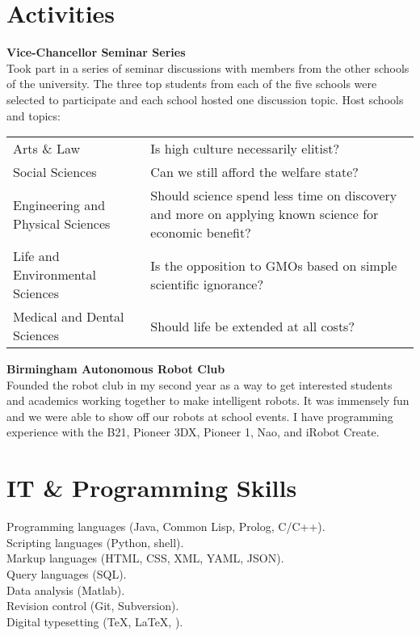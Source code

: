 \documentclass[10pt, a4paper]{article}
\newcommand{\years}[1]{\marginnote{\scriptsize #1}}
\begin{document}
{{\section*{Activities}
\years{2011--2012}\textbf{Vice-Chancellor Seminar Series}\\[.2cm]
Took part in a series of seminar discussions with members from the
other schools of the university. The three top students from each of
the five schools were selected to participate and each school hosted
one discussion topic. Host schools and topics:\\[.1cm]
\small{
  \begin{tabular}{l p{8cm}}
    \hspace{.5cm}Arts \& Law                       & Is high culture necessarily elitist?\\
    \hspace{.5cm}Social Sciences                   & Can we still afford the welfare state?\\
    \hspace{.5cm}Engineering and Physical Sciences & Should science spend less time on discovery and more on applying known science for economic benefit?\\
    \hspace{.5cm}Life and Environmental Sciences   & Is the opposition to GMOs based on simple scientific ignorance?\\
    \hspace{.5cm}Medical and Dental Sciences       & Should life be extended at all costs?
  \end{tabular}
}
\vspace{.3cm}

\years{2010--2012}\textbf{Birmingham Autonomous Robot Club}\\[.2cm]
Founded the robot club in my second year as a way to get interested
students and academics working together to make intelligent robots. It
was immensely fun and we were able to show off our robots at school
events. I have programming experience with the B21, Pioneer 3DX,
Pioneer 1, Nao, and iRobot Create.

\section*{IT \& Programming Skills}
Programming languages (Java, Common Lisp, Prolog, C/C++).\\
Scripting languages (Python, shell).\\
Markup languages (HTML, CSS, XML, YAML, JSON).\\
Query languages (SQL).\\
Data analysis (Matlab).\\
Revision control (Git, Subversion).\\
Digital typesetting (\TeX, \LaTeX, \XeTeX).

}}
\end{document}
